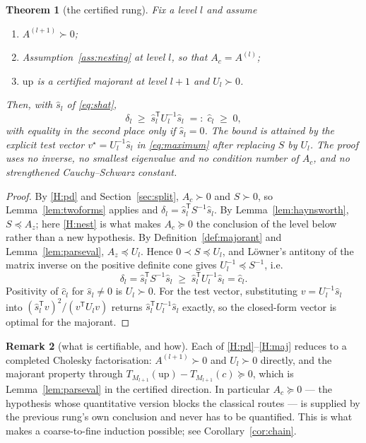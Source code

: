 \documentclass[11pt,a4paper]{article}
\theoremstyle{plain}
\newtheorem{theorem}{Theorem}[section]
\theoremstyle{definition}
\newtheorem{remark}[theorem]{Remark}
\newcommand{\T}{\mathsf{T}}
\newcommand{\Tm}[1]{T_{#1}}
\newcommand{\shat}{\widehat{s}}
\newcommand{\PSD}{\succeq 0}
\newcommand{\PD}{\succ 0}
\begin{document}
\begin{theorem}[the certified rung]
\label{thm:rung}
Fix a level $l$ and assume
\begin{enumerate}[label=\textup{(H\arabic*)},leftmargin=3.2em]
\item\label{H:pd} $A^{(l+1)}\PD$;
\item\label{H:nest} Assumption~\ref{ass:nesting} at level $l$, so that
      $A_{c}=A^{(l)}$;
\item\label{H:maj} $\mathrm{up}$ is a certified majorant at level $l+1$ and
      $U_{l}\PD$.
\end{enumerate}
Then, with $\shat_{l}$ of \eqref{eq:shat},
\begin{equation}
\label{eq:8R}
  \delta_{l} \;\ge\; \shat_{l}^{\T}U_{l}^{-1}\shat_{l} \;=:\; \widehat c_{l}
  \;\ge\;0 ,
\end{equation}
with equality in the second place only if $\shat_{l}=0$. The bound is attained by the
explicit test vector $v^{\star}=U_{l}^{-1}\shat_{l}$ in \eqref{eq:maximum} after
replacing $S$ by $U_{l}$. The proof uses no inverse, no smallest eigenvalue and no
condition number of $A_{c}$, and no strengthened Cauchy--Schwarz constant.
\end{theorem}

\begin{proof}
By \ref{H:pd} and Section~\ref{sec:split}, $A_{c}\PD$ and $S\PD$, so
Lemma~\ref{lem:twoforms} applies and $\delta_{l}=\shat_{l}^{\T}S^{-1}\shat_{l}$.
By Lemma~\ref{lem:haynsworth}, $S\preceq A_{z}$; here \ref{H:nest} is what makes
$A_{c}\PSD$ the conclusion of the level below rather than a new hypothesis. By
Definition~\ref{def:majorant} and Lemma~\ref{lem:parseval},
$A_{z}\preceq U_{l}$. Hence $0\prec S\preceq U_{l}$, and L\"owner's antitony of the
matrix inverse on the positive definite cone \cite{Loewner1934} gives
$U_{l}^{-1}\preceq S^{-1}$, i.e.
\[
  \delta_{l}=\shat_{l}^{\T}S^{-1}\shat_{l}
  \;\ge\;\shat_{l}^{\T}U_{l}^{-1}\shat_{l}=\widehat c_{l}.
\]
Positivity of $\widehat c_{l}$ for $\shat_{l}\neq0$ is $U_{l}\PD$. For the test
vector, substituting $v=U_{l}^{-1}\shat_{l}$ into
$(\shat_{l}^{\T}v)^{2}/(v^{\T}U_{l}v)$ returns $\shat_{l}^{\T}U_{l}^{-1}\shat_{l}$
exactly, so the closed-form vector is optimal for the majorant.
\end{proof}

\begin{remark}[what is certifiable, and how]
\label{rem:certify}
Each of \ref{H:pd}--\ref{H:maj} reduces to a completed Cholesky factorisation:
$A^{(l+1)}\PD$ and $U_{l}\PD$ directly, and the majorant property through
$\Tm{M_{l+1}}(\mathrm{up})-\Tm{M_{l+1}}(c)\PSD$, which is
Lemma~\ref{lem:parseval} in the certified direction. In particular
$A_{c}\PSD$ --- the hypothesis whose quantitative version blocks the classical
routes --- is supplied by the previous rung's own conclusion and never has to be
quantified. This is what makes a coarse-to-fine induction possible; see
Corollary~\ref{cor:chain}.
\end{remark}
\end{document}
